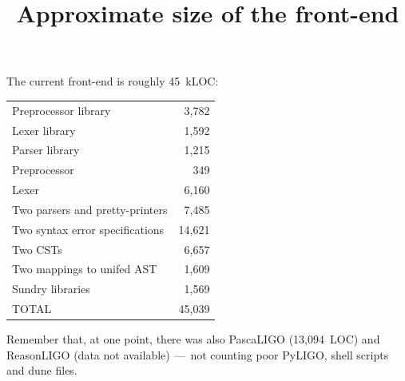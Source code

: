 \documentclass[wide]{slides}
\begin{document}
\begin{slide}
  \title{Approximate size of the front-end}

  The current front\hyp{}end is roughly 45~kLOC:
  \begin{center}
    \begin{tabular}{l|r}
      Preprocessor library & 3,782 \\
      Lexer library & 1,592 \\
      Parser library & 1,215 \\
      Preprocessor & 349 \\
      Lexer & 6,160 \\
      Two parsers and pretty-printers & 7,485 \\
      Two syntax error specifications & 14,621 \\
      Two CSTs & 6,657 \\
      Two mappings to unifed AST & 1,609 \\
      Sundry libraries & 1,569 \\
      \hline
      TOTAL & 45,039
    \end{tabular}
  \end{center}
  Remember that, at one point, there was also \textsf{PascaLIGO}
  (13,094~LOC) and \textsf{ReasonLIGO} (data not available) ---~not
  counting poor \textsf{PyLIGO}, shell scripts and dune files.

\end{slide}
\end{document}
